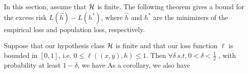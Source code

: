 
In this section, assume that $\mathcal H$ is finite. The following theorem gives a bound for the excess risk $L(\hat{h}) - L(h^{*})$, where $\hat{h}$ and $h^*$ are the minimizers of the empirical loss and population loss, respectively.

\begin{theorem}\label{lec4:thm:finite}
Suppose that our hypothesis class $\mathcal H$ is finite and that our loss function $\ell$ is bounded in $[0,1]$, i.e. $0 \leq \ell((x, y), h) \leq 1$. Then $\forall \delta \  s.t. \  0 < \delta < \frac{1}{2}$ , with probability at least $1 - \delta$, we have 
As a corollary, we also have 
\end{theorem}

